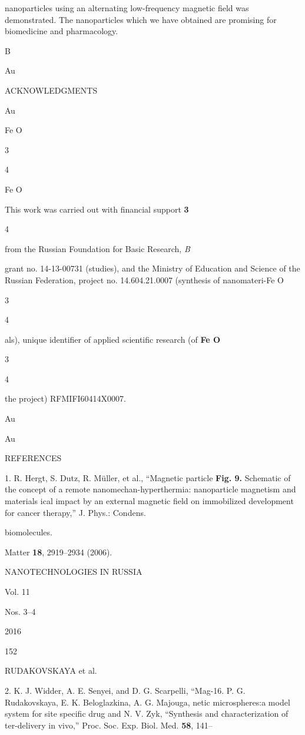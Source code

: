 \documentclass[12pt,a4paper]{article}
\begin{document}
nanoparticles using an alternating low-frequency magnetic field was
demonstrated. The nanoparticles which we have obtained are promising for
biomedicine and pharmacology.

B

Au

ACKNOWLEDGMENTS

Au

Fe O

3

4

Fe O

This work was carried out with financial support \textbf{3}

4

from the Russian Foundation for Basic Research, \emph{B}

grant no. 14-13-00731 (studies), and the Ministry of Education and
Science of the Russian Federation, project no. 14.604.21.0007 (synthesis
of nanomateri-Fe O

3

4

als), unique identifier of applied scientific research (of \textbf{Fe O}

3

4

the project) RFMIFI60414X0007.

Au

Au

REFERENCES

1. R. Hergt, S. Dutz, R. Müller, et al., ``Magnetic particle
\textbf{Fig. 9.} Schematic of the concept of a remote
nanomechan-hyperthermia: nanoparticle magnetism and materials ical
impact by an external magnetic field on immobilized development for
cancer therapy,'' J. Phys.: Condens.

biomolecules.

Matter \textbf{18}, 2919--2934 (2006).

NANOTECHNOLOGIES IN RUSSIA

Vol. 11

Nos. 3--4

2016

152

RUDAKOVSKAYA et al.

2. K. J. Widder, A. E. Senyei, and D. G. Scarpelli, ``Mag-16. P. G.
Rudakovskaya, E. K. Beloglazkina, A. G. Majouga, netic microspheres:a
model system for site specific drug and N. V. Zyk, ``Synthesis and
characterization of ter-delivery in vivo,'' Proc. Soc. Exp. Biol. Med.
\textbf{58}, 141--
\end{document}
